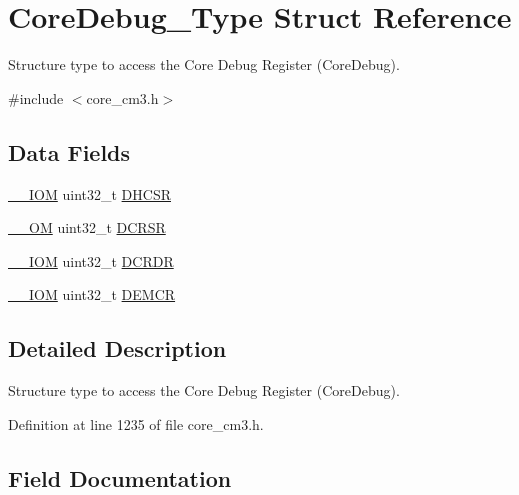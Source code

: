 \hypertarget{struct_core_debug___type}{}\section{Core\+Debug\+\_\+\+Type Struct Reference}
\label{struct_core_debug___type}


Structure type to access the Core Debug Register (Core\+Debug).  




{\ttfamily \#include $<$core\+\_\+cm3.\+h$>$}

\subsection*{Data Fields}
\begin{DoxyCompactItemize}
\item 
\hyperlink{core__sc300_8h_ab6caba5853a60a17e8e04499b52bf691}{\+\_\+\+\_\+\+I\+OM} uint32\+\_\+t \hyperlink{struct_core_debug___type_a94ca828091a9226ab6684fbf30e52909}{D\+H\+C\+SR}
\item 
\hyperlink{core__sc300_8h_a0ea2009ed8fd9ef35b48708280fdb758}{\+\_\+\+\_\+\+OM} uint32\+\_\+t \hyperlink{struct_core_debug___type_ab74a9ec90ad18e4f7a20362d362b754a}{D\+C\+R\+SR}
\item 
\hyperlink{core__sc300_8h_ab6caba5853a60a17e8e04499b52bf691}{\+\_\+\+\_\+\+I\+OM} uint32\+\_\+t \hyperlink{struct_core_debug___type_ad1dbd0dd98b6d9327f70545e0081ddbf}{D\+C\+R\+DR}
\item 
\hyperlink{core__sc300_8h_ab6caba5853a60a17e8e04499b52bf691}{\+\_\+\+\_\+\+I\+OM} uint32\+\_\+t \hyperlink{struct_core_debug___type_aa99de5f8c609f10c25ed51f57b2edd74}{D\+E\+M\+CR}
\end{DoxyCompactItemize}


\subsection{Detailed Description}
Structure type to access the Core Debug Register (Core\+Debug). 

Definition at line 1235 of file core\+\_\+cm3.\+h.



\subsection{Field Documentation}
